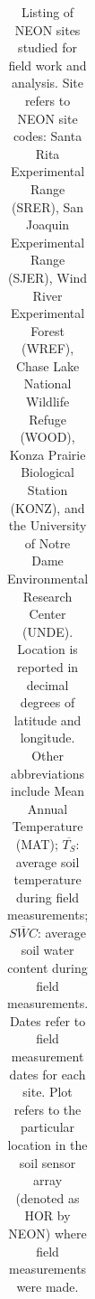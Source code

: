 \documentclass[
  letterpaper,
  DIV=11,
  numbers=noendperiod]{scrartcl}
\begin{document}
\begin{longtable}[]{@{}
  >{\raggedright\arraybackslash}p{}
  >{\raggedright\arraybackslash}p{}
  >{\raggedright\arraybackslash}p{}
  >{\raggedright\arraybackslash}p{}
  >{\raggedright\arraybackslash}p{}
  >{\raggedright\arraybackslash}p{}
  >{\raggedright\arraybackslash}p{}
  >{\raggedright\arraybackslash}p{}
  >{\raggedright\arraybackslash}p{}@{}}

\caption{\label{tbl-neon-sites}Listing of NEON sites studied for field
work and analysis. Site refers to NEON site codes: Santa Rita
Experimental Range (SRER), San Joaquin Experimental Range (SJER), Wind
River Experimental Forest (WREF), Chase Lake National Wildlife Refuge
(WOOD), Konza Prairie Biological Station (KONZ), and the University of
Notre Dame Environmental Research Center (UNDE). Location is reported in
decimal degrees of latitude and longitude. Other abbreviations include
Mean Annual Temperature (MAT); \(\overline{T_{S}}\): average soil
temperature during field measurements; \(\overline{SWC}\): average soil
water content during field measurements. Dates refer to field
measurement dates for each site. Plot refers to the particular location
in the soil sensor array (denoted as HOR by NEON) where field
measurements were made.}

\tabularnewline


\end{longtable}
\end{document}
